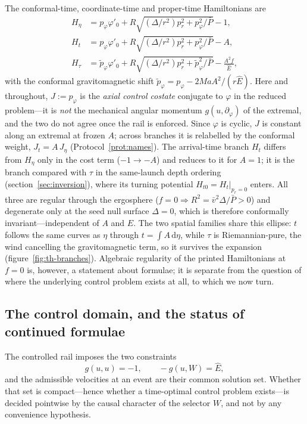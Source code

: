 \documentclass[12pt]{iopart}
\theoremstyle{plain}
\theoremstyle{definition}
\theoremstyle{remark}
\newcommand{\Ehat}{\hat E}
\newcommand{\dd}{\mathrm{d}}
\begin{document}
The conformal-time, coordinate-time and proper-time Hamiltonians are
\begin{align}
    H_\eta&=p_\varphi\varphi'_0
        +R\sqrt{(\Delta/r^2)p_r^2+p_\varphi^2/\bar P}-1,
    \label{eq:Heta}\\
    H_t&=p_\varphi\varphi'_0
        +R\sqrt{(\Delta/r^2)p_r^2+p_\varphi^2/\bar P}-A,
    \label{eq:Ht-tk}\\
    H_\tau&=\tilde p_\varphi\varphi'_0
        +R\sqrt{(\Delta/r^2)p_r^2+\tilde p_\varphi^2/\bar P}-\frac{A^2 f}{\Ehat},
    \label{eq:Htau-tk}
\end{align}
with the conformal gravitomagnetic shift
$\tilde p_\varphi=p_\varphi-2MaA^2/(r\Ehat)$. Here and throughout, $J:=p_\varphi$
is the \emph{axial control costate} conjugate to $\varphi$ in the reduced
problem---it is \emph{not} the mechanical angular momentum $g(u,\partial_\varphi)$
of the extremal, and the two do not agree once the rail is enforced. Since
$\varphi$ is cyclic, $J$ is constant along an extremal at frozen $A$; across
branches it is relabelled by the conformal weight, $J_t=A\,J_\eta$
(Protocol~\ref{prot:names}). The arrival-time branch $H_t$ differs
from $H_\eta$ only in the cost term ($-1\to-A$) and reduces to it for $A=1$; it is
the branch compared with $\tau$ in the same-launch depth ordering
(section~\ref{sec:inversion}), where its turning potential
$H_{t0}=H_t|_{p_r=0}$ enters. All three are regular through the
ergosphere ($f=0\Rightarrow R^2=\bar v^2\Delta/\bar P>0$) and degenerate only at
the seed null surface $\Delta=0$, which is therefore conformally invariant---independent of
$A$ and $\Ehat$. The two spatial families share this ellipse: $t$ follows the same
curves as $\eta$ through $t=\int A\,\dd\eta$, while $\tau$ is Riemannian-pure, the
wind cancelling the gravitomagnetic term, so it survives the expansion
(figure~\ref{fig:th-branches}). Algebraic regularity of the printed Hamiltonians
at $f=0$ is, however, a statement about formulae; it is separate from the
question of where the underlying control problem exists at all, to which we now
turn.

\subsection{The control domain, and the status of continued formulae}
\label{sec:domain}
The controlled rail imposes the two constraints
\begin{equation}
    g(u,u)=-1,\qquad -g(u,W)=\Ehat ,
    \label{eq:rail-constraints}
\end{equation}
and the admissible velocities at an event are their common solution set. Whether
that set is compact---hence whether a time-optimal control problem exists---is
decided pointwise by the causal character of the selector $W$, and not by any
convenience hypothesis.
\end{document}
